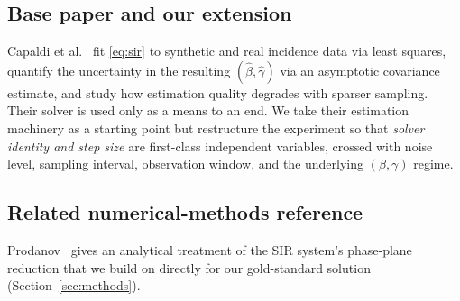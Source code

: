 \subsection{Base paper and our extension}
Capaldi et al.~\cite{capaldi2012} fit \eqref{eq:sir} to synthetic and real incidence data via
least squares, quantify the uncertainty in the resulting $(\hat\beta,\hat\gamma)$ via an asymptotic
covariance estimate, and study how estimation quality degrades with sparser sampling. Their solver
is used only as a means to an end. We take their estimation machinery as a starting point but
restructure the experiment so that \emph{solver identity and step size} are first-class independent
variables, crossed with noise level, sampling interval, observation window, and the underlying
$(\beta,\gamma)$ regime.

\subsection{Related numerical-methods reference}
Prodanov~\cite{prodanov2021} gives an analytical treatment of the SIR system's phase-plane
reduction that we build on directly for our gold-standard solution (Section~\ref{sec:methods}).
